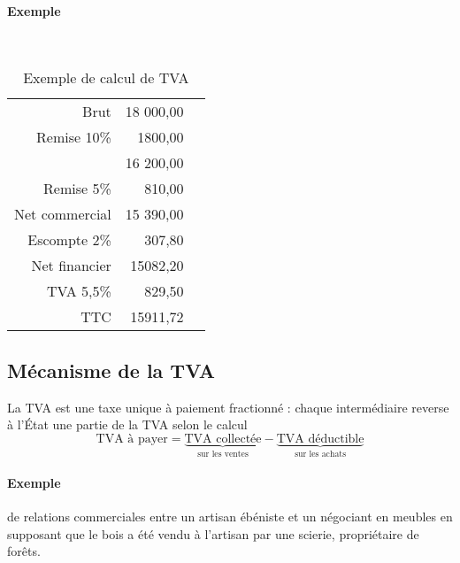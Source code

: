 \documentclass[11pt]{article}
\begin{document}
			\paragraph{Exemple}~\\
				\begin{table}[H]
					\begin{center}
						\begin{tabular}{rrl}
							Brut & 18 000,00\\
							Remise 10\% & 1800,00\\
							\cline{2-2} & 16 200,00\\
							Remise 5\% & 810,00 \\
							\cline{2-2} Net commercial & 15 390,00 \\
							Escompte 2\% & 307,80 \\
							\cline{2-2} Net financier & 15082,20\\
							TVA 5,5\% & 829,50\\
							\cline{2-2} TTC & 15911,72
						\end{tabular}
					\end{center}
					\caption{Exemple de calcul de TVA}
				\end{table}
				
		\subsection{Mécanisme de la TVA}
            La TVA est une taxe unique à paiement fractionné : chaque intermédiaire reverse à l'État une partie de la TVA selon le calcul
            $$\text{TVA à payer}=\underbrace{\text{TVA collectée}}_{\text{sur les ventes}}-\underbrace{\text{TVA déductible}}_{\text{sur les achats}}$$

            \paragraph{Exemple} de relations commerciales entre un artisan ébéniste et un négociant en meubles en supposant que le bois a été vendu à l'artisan par une scierie, propriétaire de forêts.
\end{document}
